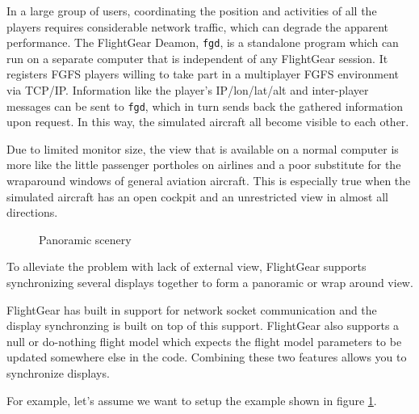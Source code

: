 \documentclass[a4paper,10pt]{article}
\begin{document}
%
In a large group of users, coordinating the position and activities of
all the players requires considerable network traffic, which can degrade
the apparent performance.
The FlightGear Deamon, \texttt{fgd}, is a standalone program which can
run on a separate computer that is independent of any FlightGear session.
It registers FGFS players
willing to take part in a multiplayer FGFS environment via TCP/IP.
Information like the player's IP/lon/lat/alt and inter-player
messages can be sent to \texttt{fgd}, 
which in turn sends back the gathered information upon request.
In this way, the simulated aircraft all become visible to each other.

Due to limited monitor size, the view that is available on a normal
computer is more like the little passenger portholes on airlines
and a poor substitute for the wraparound windows of general aviation
aircraft.  This is especially true when the simulated aircraft has
an open cockpit and an unrestricted view in almost all directions.
%
\begin{figure}
\begin{center}\end{center}
\caption{Panoramic scenery}
\label{fig:threevid}
\end{figure}

%
To alleviate the problem with lack of external view, FlightGear
supports synchronizing several displays together to form a panoramic
or wrap around view.

FlightGear has built in support for network socket communication and
the display synchronzing is built on top of this support.  FlightGear
also supports a null or do-nothing flight model which expects the
flight model parameters to be updated somewhere else in the code.
Combining these two features allows you to synchronize displays.

For example, let's assume we want to setup the example shown in figure
\ref{fig:threevid}.
\end{document}
